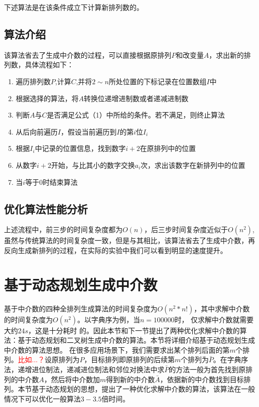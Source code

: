 \documentclass[10pt, twocolumn]{ctexart}
\begin{document}
下述算法是在该条件成立下计算新排列数的。
\subsection{算法介绍}
该算法省去了生成中介数的过程，可以直接根据原排列$P$和改变量$A$，求出新的排列数，具体流程如下：
\begin{enumerate}
  \item 遍历排列数$P$,计算$C$,并将$2\sim n$所处位置的下标记录在位置数组$I$中
  \item 根据选择的算法，将$A$转换位递增进制数或者递减进制数
  \item 判断$A$与$C$是否满足公式（1）中所给的条件。若不满足，则终止算法
  \item 从后向前遍历$I$，假设当前遍历到$I$的第$i$位$I_i$
  \item 根据$I_i$中记录的位置信息，找到数字$i+2$在原排列中的位置
  \item 从数字$i+2$开始，与比其小的数字交换$a_i$次，求出该数字在新排列中的位置
  \item 当$i$等于0时结束算法 
\end{enumerate} 
\subsection{优化算法性能分析}
上述流程中，前三步的时间复杂度都为$O(n)$，后三步时间复杂度近似于$O(n^2)$,虽然与传统算法的时间复杂度一致，但是与其相比，该算法省去了生成中介数，再反向生成新排列的过程，在实际的实验中我们可以看到明显的速度提升。

\section{基于动态规划生成中介数}
基于中介数的四种全排列生成算法的时间复杂度为$O(n^2*n!)$，其中求解中介数的时间复杂度为$O(n^2)$。以字典序为例，当$n=100000$时， 仅求解中介数就需要大约$24s$，这是十分耗时 的。因此本节和下一节提出了两种优化求解中介数的算法：基于动态规划和二叉树生成中介数的算法。本节将详细介绍基于动态规划生成中介数的算法思想。
\iffalse
在很多应用场景下，我们需要求出某个排列后面的第$m$个排列。\textcolor{red}{比如...？}设原排列为$P$，目标排列即原排列的后续第$m$个排列为$\bar{P}$。在字典序法，递增进位制法，递减进位制法和邻位对换法中求$\bar{P}$的方法一般为首先找到原排列的中介数$A$，然后将中介数加$m$得到新的中介数$\bar{A}$，依据新的中介数找到目标排列。本节基于动态规划的思想，提出了一种优化求解中介数的算法，该算法在一般情况下可以优化一般算法$3-3.5$倍时间。
\end{document}
